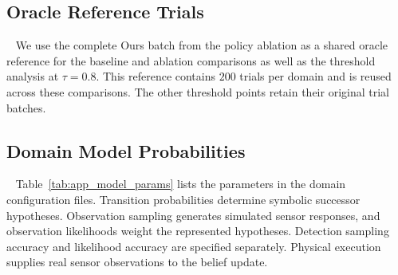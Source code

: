 \subsection{Oracle Reference Trials}~\label{appx:oracle_reference}
We use the complete Ours batch from the policy ablation as a shared oracle reference for the baseline and ablation comparisons as well as the threshold analysis at $\tau=0.8$. This reference contains $200$ trials per domain and is reused across these comparisons. The other threshold points retain their original trial batches.

\subsection{Domain Model Probabilities}~\label{appx:model_params}
Table~\ref{tab:app_model_params} lists the parameters in the domain configuration files. Transition probabilities determine symbolic successor hypotheses. Observation sampling generates simulated sensor responses, and observation likelihoods weight the represented hypotheses. Detection sampling accuracy and likelihood accuracy are specified separately. Physical execution supplies real sensor observations to the belief update.

